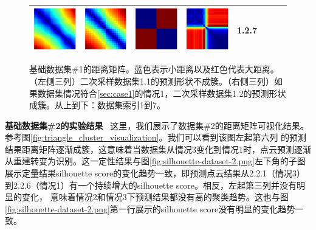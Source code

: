 \documentclass[bachelor, nocolorlinks, printoneside]{seuthesis} %
\begin{document}
\begin{Main}
\begin{figure}[ht!]
\begin{centering}
\begin{tabular}{cccc|cccc}
        \includegraphics[width=0.12\columnwidth,keepaspectratio]{figs/toyset_matrices/cluster_5by20_7_3.png} &  
        \includegraphics[width=0.12\columnwidth,keepaspectratio]{figs/toyset_matrices/cluster_2by10_7_1.png} &
        \includegraphics[width=0.12\columnwidth,keepaspectratio]{figs/toyset_matrices/cluster_2by10_7_2.png} &
        \includegraphics[width=0.12\columnwidth,keepaspectratio]{figs/toyset_matrices/cluster_2by10_7_3.png} & 1.2.7\\
        \bottomrule  
        \end{tabular}  \vspace{-2mm}
        \caption{\small 基础数据集\#1的距离矩阵。蓝色表示小距离以及红色代表大距离。（左侧三列）二次采样数据集1.1的预测形状不成簇。（右侧三列）如果数据集情况符合\ref{sec:case1}的情况1，二次采样数据集1.2的预测形状成簇。从上到下：数据集索引1到7。}
        \label{fig:cluster_visualization}
    \end{centering}
    \end{figure}
\FloatBarrier
\textbf{基础数据集\#2的实验结果} ~这里，我们展示了数据集\#2的距离矩阵可视化结果。参考图\ref{fig:triangle_cluster_visualization}。我们可以看到该图左起第六列
的预测结果距离矩阵逐渐成簇，这意味着当数据集从情况3变化到情况1时，点云预测逐渐从重建转变为识别。这一定性结果与图\ref{fig:silhouette-dataset-2.png}左下角的子图
展示定量结果silhouette score的变化趋势一致，即预测点云结果从2.2.1（情况3）到2.2.6（情况1）有一个持续增大的silhouette score。相反，左起第三列并没有明显的变化，
意味着情况2和情况3下预测结果都没有高的聚类趋势。这也与图\ref{fig:silhouette-dataset-2.png}第一行展示的silhouette score没有明显的变化趋势一致。



\end{Main}
\end{document}
